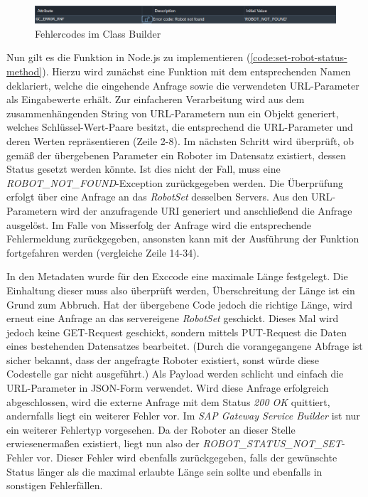 \begin{figure}[!ht]
	\centering
	\includegraphics[width=\textwidth]{Bilder/ABAP/2020-12-04 10_22_23-Class Builder_ Display Class ZCL_ZEWM_ROBCO_DPC_EXT_cut.png}
	\caption{Fehlercodes im Class Builder}
	\label{fig:class-builder}
\end{figure}

Nun gilt es die Funktion in Node.js zu implementieren (\autoref{code:set-robot-status-method}).
Hierzu wird zunächst eine Funktion mit dem entsprechenden Namen deklariert, welche die eingehende Anfrage sowie die verwendeten URL-Parameter als Eingabewerte erhält.
Zur einfacheren Verarbeitung wird aus dem zusammenhängenden String von URL-Parametern nun ein Objekt generiert, welches Schlüssel-Wert-Paare besitzt, die entsprechend die URL-Parameter und deren Werten repräsentieren (Zeile 2-8).
Im nächsten Schritt wird überprüft, ob gemäß der übergebenen Parameter ein Roboter im Datensatz existiert, dessen Status gesetzt werden könnte.
Ist dies nicht der Fall, muss eine \emph{ROBOT\_NOT\_FOUND}-Exception zurückgegeben werden.
Die Überprüfung erfolgt über eine Anfrage an das \emph{RobotSet} desselben Servers.
Aus den URL-Parametern wird der anzufragende \ac{URI} generiert und anschließend die Anfrage ausgelöst.
Im Falle von Misserfolg der Anfrage wird die entsprechende Fehlermeldung zurückgegeben, ansonsten kann mit der Ausführung der Funktion fortgefahren werden (vergleiche Zeile 14-34).

In den Metadaten wurde für den Exccode eine maximale Länge festgelegt.
Die Einhaltung dieser muss also überprüft werden, Überschreitung der Länge ist ein Grund zum Abbruch.
Hat der übergebene Code jedoch die richtige Länge, wird erneut eine Anfrage an das servereigene \emph{RobotSet} geschickt.
Dieses Mal wird jedoch keine GET-Request geschickt, sondern mittels PUT-Request die Daten eines bestehenden Datensatzes bearbeitet.
(Durch die vorangegangene Abfrage ist sicher bekannt, dass der angefragte Roboter existiert, sonst würde diese Codestelle gar nicht ausgeführt.)
Als Payload werden schlicht und einfach die URL-Parameter in \ac{JSON}-Form verwendet.
Wird diese Anfrage erfolgreich abgeschlossen, wird die externe Anfrage mit dem Status \emph{200 OK} quittiert, andernfalls liegt ein weiterer Fehler vor.
Im \emph{SAP Gateway Service Builder} ist nur ein weiterer Fehlertyp vorgesehen.
Da der Roboter an dieser Stelle erwiesenermaßen existiert, liegt nun also der \emph{ROBOT\_STATUS\_NOT\_SET}-Fehler vor.
Dieser Fehler wird ebenfalls zurückgegeben, falls der gewünschte Status länger als die maximal erlaubte Länge sein sollte und ebenfalls in sonstigen Fehlerfällen.


